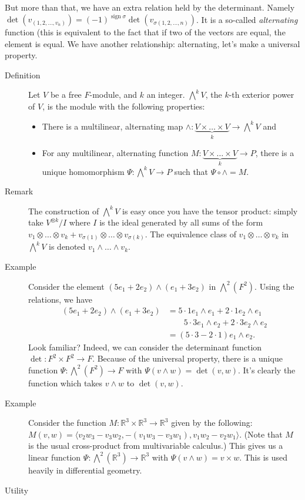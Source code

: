\documentclass[12pt]{article}
\newcommand{\bbR}{\mathbb{R}}
\begin{document}
But more than that, we have an extra relation held by the
determinant. Namely $\det (v_{(1,2,\dotsc,v_n)}) =(-1)^{\operatorname{sign}
  \sigma}\det(v_{\sigma(1,2,\dotsc, n)})$. It is a so-called
\emph{alternating} function (this is equivalent to the fact that if
two of the vectors are equal, the element is equal. We have another
relationship: alternating, let's make a universal property. 
\begin{description}
\item[Definition] Let $V$ be a free $F$-module, and $k$ an
  integer. $\bigwedge^k V$, the $k$-th exterior power of $V$, is the
  module with the following properties:
\begin{itemize}
\item There is a multilinear, alternating map $\wedge:
  \underbrace{V\times \dotsc \times V}_k\rightarrow \bigwedge^k V$ and
\item  For any multilinear, alternating
  function $M: \underbrace{V\times \dotsc \times V}_k \rightarrow P$,
  there is a unique homomorphism $\Psi: \bigwedge^k V \rightarrow P$
  such that $\Psi\circ \wedge = M$. 
\end{itemize}
\item[Remark]  The construction of $\bigwedge^k V$ is easy once you
  have the tensor product: simply take $V^{\otimes k}/I$ where $I$ is
  the ideal generated by all sums of the form $v_1 \otimes \dotsc
  \otimes v_k + v_{\sigma(1)} \otimes \dotsc \otimes
  v_{\sigma(k)}$. The equivalence class of $v_1\otimes \dotsc \otimes
  v_k$ in $\bigwedge^k V$ is denoted $v_1 \wedge \dotsc \wedge v_k$. 
\item[Example] Consider the element $(5e_1+2e_2) \wedge (e_1 + 3e_2)$
  in $\bigwedge^2(F^2)$. Using the relations, we have
  \begin{align*}
    (5e_1+2e_2) \wedge (e_1 + 3e_2) &= 5\cdot 1 e_1 \wedge e_1 +
                                      2\cdot 1 e_2 \wedge e_1 \\
& \qquad 5 \cdot 3 e_1 \wedge e_2 + 2\cdot 3 e_2 \wedge e_2\\
  &= (5\cdot 3 - 2 \cdot 1 ) e_1 \wedge e_2.
  \end{align*}
Look familiar? Indeed, we can consider the determinant function $\det:
F^2 \times F^2 \rightarrow F$. Because of the universal property,
there is a unique function $\Psi: \bigwedge^2(F^2) \rightarrow F$ with
$\Psi(v\wedge w) = \det(v,w)$. It's clearly the function which takes
$v\wedge w$ to $\det(v,w)$.
\item[Example] Consider the function $M: \bbR^3 \times
  \bbR^3\rightarrow \bbR^3$
  given by the following: $M(v, w) = \langle v_2w_3-v_3w_2,
  -(v_1w_3-v_3w_1),v_1w_2-v_2w_1\rangle$. (Note that $M$ is the usual
  cross-product from multivariable calculus.) This gives us a linear
  function $\Psi: \bigwedge^2(\bbR^3)\rightarrow \bbR^3$ with
  $\Psi(v\wedge w) = v\times w$. This is used heavily in differential
  geometry. 
\item[Utility] 
\end{description}
\end{document}
